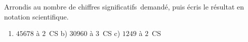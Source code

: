 \documentclass[11pt,a4paper]{article}
\newcommand{\CS}{chiffres significatifs}
\begin{document}
\begin{exo}
Arrondis au nombre de \CS\ demandé, puis écris le résultat en notation scientifique.
\begin{enumerate}[label=\alph*),leftmargin=1.6em,itemsep=1pt]
  \item $\num{45678}$ à $2$~CS \qquad b) $\num{30960}$ à $3$~CS \qquad c) $\num{1249}$ à $2$~CS
\end{enumerate}
\end{exo}
\end{document}
